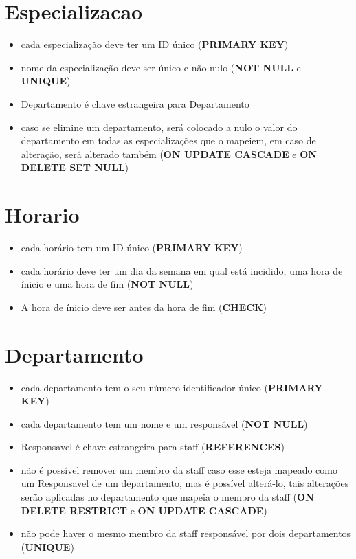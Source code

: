 \documentclass[article, a4paper, 12pt, oneside]{memoir}
\begin{document}
\section*{Especializacao}
\begin{itemize}
	\item cada especialização deve ter um ID único (\textbf{PRIMARY KEY})
	\item nome da especialização deve ser único e não nulo (\textbf{NOT NULL} e \textbf{UNIQUE})
	\item Departamento é chave estrangeira para Departamento
	\item caso se elimine um departamento, será colocado a nulo o valor do departamento em todas as especializações que o mapeiem, em caso de alteração, será alterado também (\textbf{ON UPDATE CASCADE} e \textbf{ON DELETE SET NULL})
\end{itemize}

\section*{Horario}
\begin{itemize}
	\item cada horário tem um ID único (\textbf{PRIMARY KEY})
	\item cada horário deve ter um dia da semana em qual está incidido, uma hora de ínicio e uma hora de fim (\textbf{NOT NULL})
	\item A hora de ínicio deve ser antes da hora de fim (\textbf{CHECK})
\end{itemize}

\section*{Departamento}
\begin{itemize}
	\item cada departamento tem o seu número identificador único (\textbf{PRIMARY KEY})
	\item cada departamento tem um nome e um responsável (\textbf{NOT NULL})
	\item Responsavel é chave estrangeira para staff (\textbf{REFERENCES})
	\item não é possível remover um membro da staff caso esse esteja mapeado como um Responsavel de um departamento, mas é possível alterá-lo, tais alterações serão aplicadas no departamento que mapeia o membro da staff (\textbf{ON DELETE RESTRICT} e \textbf{ON UPDATE CASCADE})
	\item não pode haver o mesmo membro da staff responsável por dois departamentos (\textbf{UNIQUE})
\end{itemize}
\end{document}
